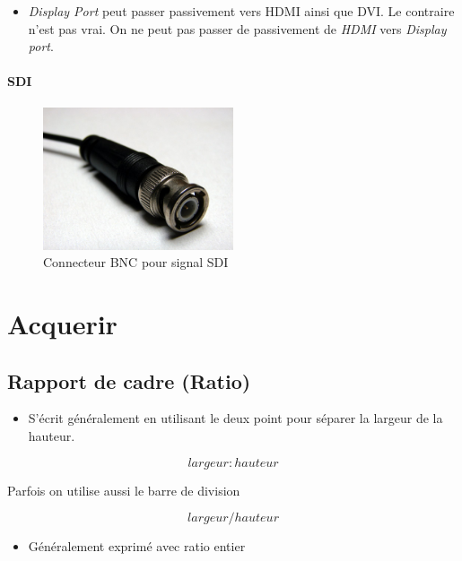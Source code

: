 \documentclass[
  french,
]{book}
\providecommand{\tightlist}{%
  \setlength{\itemsep}{0pt}\setlength{\parskip}{0pt}}
\begin{document}
\begin{itemize}
\tightlist
\item
  \emph{Display Port} peut passer passivement vers HDMI ainsi que DVI. Le contraire n'est pas vrai. On ne peut pas passer de passivement de \emph{HDMI} vers \emph{Display port}.
\end{itemize}

\hypertarget{sdi}{%
\subsubsection{SDI}\label{sdi}}

\begin{figure}
\centering
\includegraphics[width=0.5\textwidth,height=\textheight]{medias/lexique/signaux/numerique/sdi.jpg}
\caption{Connecteur BNC pour signal SDI}
\end{figure}

\hypertarget{acquerir}{%
\chapter{Acquerir}\label{acquerir}}

\hypertarget{rapport-de-cadre-ratio}{%
\section{Rapport de cadre (Ratio)}\label{rapport-de-cadre-ratio}}

\begin{itemize}
\tightlist
\item
  S'écrit généralement en utilisant le deux point pour séparer la largeur de la hauteur.
\end{itemize}

\[
largeur : hauteur 
\]

Parfois on utilise aussi le barre de division

\[
largeur / hauteur 
\]

\begin{itemize}
\tightlist
\item
  Généralement exprimé avec ratio entier
\end{itemize}
\end{document}
